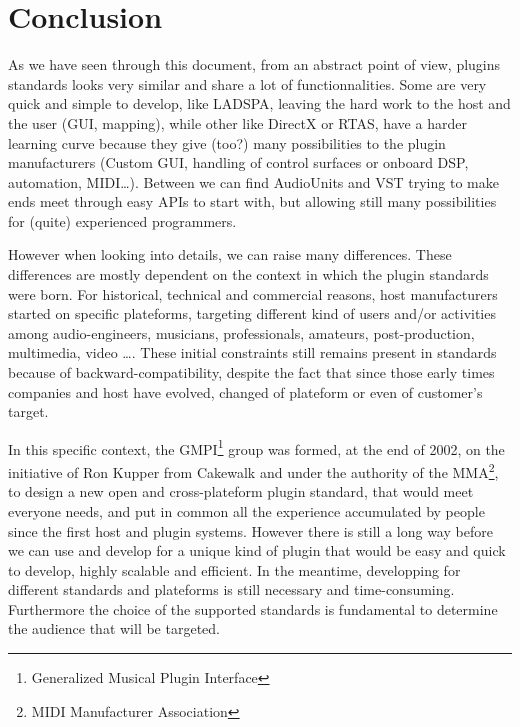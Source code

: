 

\chapter{Conclusion}
\noindent As we have seen through this document, from an abstract point of view, plugins standards looks very similar and share a lot of functionnalities. Some are very quick and simple to develop, like LADSPA, leaving the hard work to the host and the user (GUI, mapping), while other like DirectX or RTAS, have a harder learning curve because they give (too?) many possibilities to the plugin manufacturers (Custom GUI, handling of control surfaces or onboard DSP, automation, MIDI\ldots). Between we can find AudioUnits and VST trying to make ends meet through easy APIs to start with, but allowing still many possibilities for (quite) experienced programmers.

\noindent However when looking into details, we can raise many differences. These differences are mostly dependent on the context in which the plugin standards were born. For historical, technical and commercial reasons, host manufacturers started on specific plateforms, targeting different kind of users and/or activities among audio-engineers, musicians, professionals, amateurs, post-production, multimedia, video \ldots. These initial constraints still remains present in standards because of backward-compatibility, despite the fact that since those early times companies and host have evolved, changed of plateform or even of customer's target.

\noindent In this specific context, the GMPI\footnote{Generalized Musical Plugin Interface} group was formed, at the end of 2002, on the initiative of Ron Kupper from Cakewalk and under the authority of the MMA\footnote{MIDI Manufacturer Association}, to design a new open and cross-plateform plugin standard, that would meet everyone needs, and put in common all the experience accumulated by people since the first host and plugin systems. However there is still a long way before we can use and develop for a unique kind of plugin that would be easy and quick to develop, highly scalable and efficient. In the meantime, developping for different standards and plateforms is still necessary and time-consuming. Furthermore the choice of the supported standards is fundamental to determine the audience that will be targeted.
